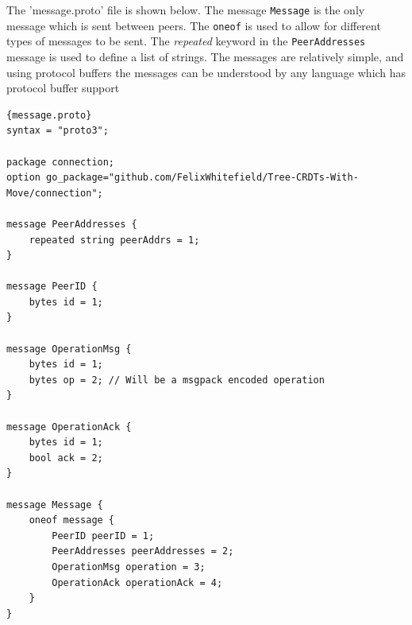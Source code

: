 \documentclass[12pt]{report}
\begin{document}
The 'message.proto' file is shown below. The message \texttt{Message} is the only message which is sent between peers. The \texttt{oneof} is used to allow for different types of messages to be sent. The \textit{repeated} keyword in the \texttt{PeerAddresses} message is used to define a list of strings. The messages are relatively simple, and using protocol buffers the messages can be understood by any language which has protocol buffer support 

\begin{lstlisting}[language=protobuf3, style=protobuf]{message.proto}
syntax = "proto3";

package connection;
option go_package="github.com/FelixWhitefield/Tree-CRDTs-With-Move/connection";

message PeerAddresses {
    repeated string peerAddrs = 1;
}

message PeerID {
    bytes id = 1;
}

message OperationMsg {
    bytes id = 1; 
    bytes op = 2; // Will be a msgpack encoded operation
}

message OperationAck {
    bytes id = 1;
    bool ack = 2;
}

message Message {
    oneof message {
        PeerID peerID = 1;
        PeerAddresses peerAddresses = 2;
        OperationMsg operation = 3;
        OperationAck operationAck = 4;
    }
}
\end{lstlisting}




\end{document}
